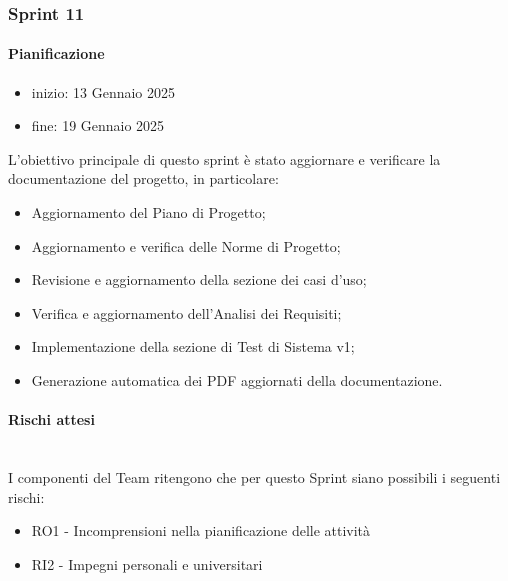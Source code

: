 \documentclass{article}
\begin{document}
            \subsubsection{Sprint 11}
                \paragraph{Pianificazione}
                \begin{itemize}
                    \item inizio: 13 Gennaio 2025
                    \item fine: 19 Gennaio 2025
                \end{itemize}
                L'obiettivo principale di questo sprint è stato aggiornare e verificare la documentazione del progetto, in particolare:
                \begin{itemize}
                    \item Aggiornamento del Piano di Progetto;
                    \item Aggiornamento e verifica delle Norme di Progetto;
                    \item Revisione e aggiornamento della sezione dei casi d'uso;
                    \item Verifica e aggiornamento dell'Analisi dei Requisiti;
                    \item Implementazione della sezione di Test di Sistema v1;
                    \item Generazione automatica dei PDF aggiornati della documentazione.
                \end{itemize}


                \paragraph{Rischi attesi}\mbox{}\\
                I componenti del Team ritengono che per questo Sprint siano possibili i seguenti rischi:
                \begin{itemize}
                    \item RO1 - Incomprensioni nella pianificazione delle attività
                    \item RI2 - Impegni personali e universitari
                \end{itemize}
\end{document}
